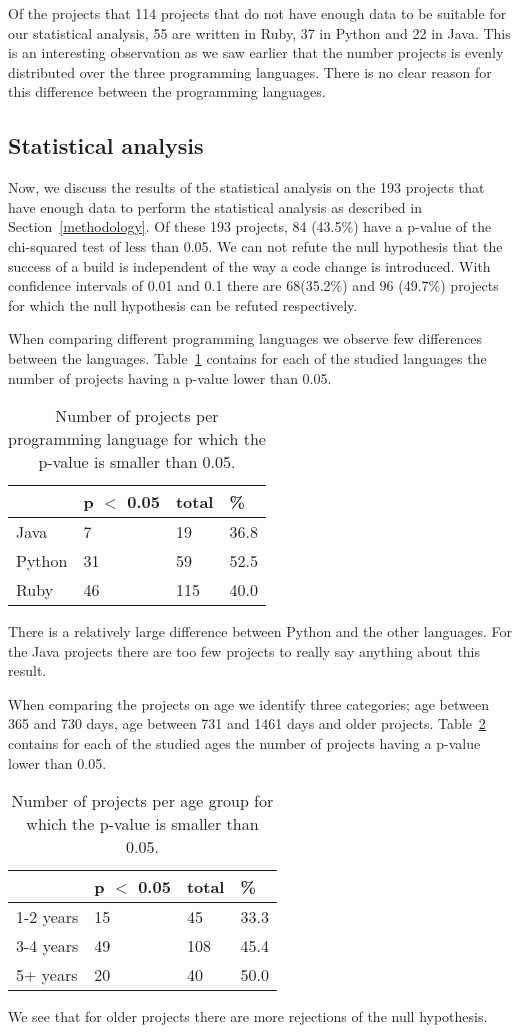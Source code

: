Of the projects that 114 projects that do not have enough data to be suitable for our statistical analysis, 55 are written in Ruby, 37 in Python and 22 in Java.
This is an interesting observation as we saw earlier that the number projects is evenly distributed over the three programming languages.
There is no clear reason for this difference between the programming languages.

\subsection{Statistical analysis}
Now, we discuss the results of the statistical analysis on the 193 projects that have enough data to perform the statistical analysis as described in Section~\ref{methodology}.
Of these 193 projects, 84 (43.5\%) have a p-value of the chi-squared test of less than 0.05. 
We can not refute the null hypothesis that the success of a build is independent of the way a code change is introduced.
With confidence intervals of 0.01 and 0.1 there are 68(35.2\%) and 96 (49.7\%) projects for which the null hypothesis can be refuted respectively.

When comparing different programming languages we observe few differences between the languages.
Table~\ref{tab:p-for-lang} contains for each of the studied languages the number of projects having a p-value lower than 0.05.
\begin{table}[h]
\begin{tabular}{ l | l l l}
 & p $<$ 0.05 & total & \%\\
\hline
Java & 7 & 19 & 36.8\\
Python & 31 & 59 & 52.5 \\
Ruby & 46 & 115 & 40.0
\end{tabular}
\caption{Number of projects per programming language for which the p-value is smaller than 0.05.}
\label{tab:p-for-lang}
\end{table}
There is a relatively large difference between Python and the other languages. 
For the Java projects there are too few projects to really say anything about this result.

When comparing the projects on age we identify three categories; age between 365 and 730 days, age between 731 and 1461 days and older projects.
Table~\ref{tab:p-for-age} contains for each of the studied ages the number of projects having a p-value lower than 0.05.
\begin{table}[h]
\begin{tabular}{ l | l l l}
 & p $<$ 0.05 & total & \%\\
\hline
1-2 years & 15 & 45 & 33.3\\
3-4 years & 49 & 108 & 45.4 \\
5+ years & 20 & 40 & 50.0
\end{tabular}
\caption{Number of projects per age group for which the p-value is smaller than 0.05.}
\label{tab:p-for-age}
\end{table}
We see that for older projects there are more rejections of the null hypothesis. 

